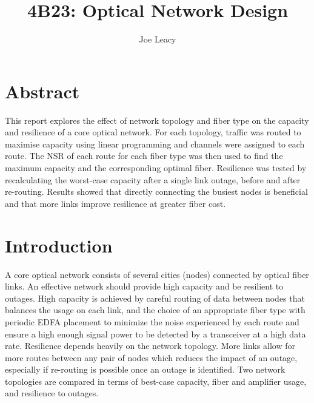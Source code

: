 \documentclass[12pt,a4paper]{article}
\title{4B23: Optical Network Design}
\author{Joe Leacy}
\begin{document}
\maketitle

\section{Abstract}
This report explores the effect of network topology and fiber type on the capacity and resilience of a core optical network. For each topology, traffic was routed to maximise capacity using linear programming and channels were assigned to each route. The NSR of each route for each fiber type was then used to find the maximum capacity and the corresponding optimal fiber. Resilience was tested by recalculating the worst-case capacity after a single link outage, before and after re-routing. Results showed that directly connecting the busiest nodes is beneficial and that more links improve resilience at greater fiber cost.

\section{Introduction}
A core optical network consists of several cities (nodes) connected by optical fiber links. An effective network should provide high capacity and be resilient to outages. High capacity is achieved by careful routing of data between nodes that balances the usage on each link, and the choice of an appropriate fiber type with periodic EDFA placement to minimize the noise experienced by each route and ensure a high enough signal power to be detected by a transceiver at a high data rate. Resilience depends heavily on the network topology. More links allow for more routes between any pair of nodes which reduces the impact of an outage, especially if re-routing is possible once an outage is identified. Two network topologies are compared in terms of best-case capacity, fiber and amplifier usage, and resilience to outages.
\end{document}
